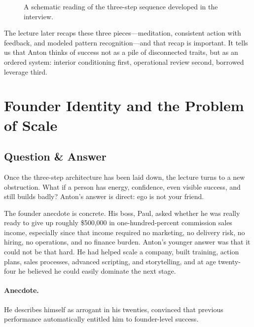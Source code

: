 \begin{figure}[h]
\centering
{}
\caption{A schematic reading of the three-step sequence developed in the interview.}
\end{figure}

The lecture later recaps these three pieces---meditation, consistent action with feedback, and modeled pattern recognition---and that recap is important. It tells us that Anton thinks of success not as a pile of disconnected traits, but as an ordered system: interior conditioning first, operational review second, borrowed leverage third.

\section{Founder Identity and the Problem of Scale}

\subsection{Question \& Answer}

Once the three-step architecture has been laid down, the lecture turns to a new obstruction. What if a person has energy, confidence, even visible success, and still builds badly? Anton's answer is direct: ego is not your friend.

The founder anecdote is concrete. His boss, Paul, asked whether he was really ready to give up roughly \$500{,}000 in one-hundred-percent commission sales income, especially since that income required no marketing, no delivery risk, no hiring, no operations, and no finance burden. Anton's younger answer was that it could not be that hard. He had helped scale a company, built training, action plans, sales processes, advanced scripting, and storytelling, and at age twenty-four he believed he could easily dominate the next stage.

\paragraph{Anecdote.}
He describes himself as arrogant in his twenties, convinced that previous performance automatically entitled him to founder-level success.

